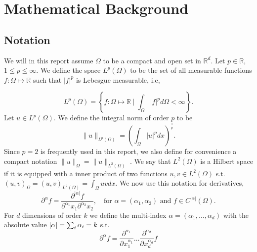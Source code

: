 
\section{Mathematical Background}%
\label{sec:mathematical_background}

\subsection{Notation}%
\label{sub:notation}

We will in this report assume $\Omega $ to be a compact and open set in $\mathbb{R} ^{d}$. Let $p \in \mathbb{R} $, $ 1 \le  p \le  \infty$. We define the space $L^{p}\left( \Omega  \right) $ to be the set of all measurable functions $f: \Omega  \mapsto \mathbb{R} $ such that
$\left\lvert f \right\rvert ^{p}$ is Lebesgue measurable, i.e,

\begin{equation*}
    L^{p}\left( \Omega  \right) = \left\{ f: \Omega \mapsto \mathbb{R}  \mid \int_{\Omega }^{} \left\lvert f \right\rvert ^{p} d \Omega  < \infty  \right\}
.\end{equation*}
Let $u \in L^{p}\left( \Omega  \right) $. We define the integral norm of order $p$ to be \[
\| u \|_{ L^{p}\left( \Omega  \right)  }^{  }  = \left( \int_{\Omega }^{} \left\lvert u \right\rvert ^{p} dx  \right) ^{\frac{1}{p}}.
\]
Since $p=2$ is frequently used in this report, we also define for convenience a compact notation $\| u \|_{ \Omega  }^{  }  = \| u \|_{ L^{2}\left( \Omega  \right)  }^{  } $ .  We say that $L^{2}\left( \Omega  \right) $ is a Hilbert space if it is equipped with a inner
product of two functions $u,v \in L^{2}\left( \Omega  \right) $ s.t.
    $
\left( u,v \right) _{\Omega } = \left( u,v \right) _{L^2\left( \Omega  \right) } = \int_{\Omega }^{} u  v dx.
$
We now use this notation for derivatives,
\begin{equation}
\label{eq:mixed_derivative}
\partial ^{\alpha  } f = \frac{\partial ^{\left\lvert \alpha  \right\rvert } f}{ \partial ^{\alpha _{1} } x_{1} \partial ^{\alpha _{2}} x_{2}  }, \quad \text{for } \alpha=\left( \alpha _{1}, \alpha _{2} \right) \text{ and } f \in C^{\left\lvert \alpha  \right\rvert }
\left( \Omega  \right)
.\end{equation}
For $d$ dimensions of order $k$ we define the multi-index $\alpha  = ( \alpha _{1}, \ldots, \alpha _{d})  $ with the absolute value $\left\lvert  \alpha   \right\rvert = \sum_{i}^{}  \alpha _{i} = k $ s.t.
\[
\partial ^{\alpha} f = \frac{\partial ^{ \alpha_{1}  }  } {\partial^{} x_{1}^{\alpha _{1}}  } \ldots \frac{\partial ^{ \alpha_{d}  }  } {\partial^{} x_{d}^{\alpha _{d}}  } f
\]

